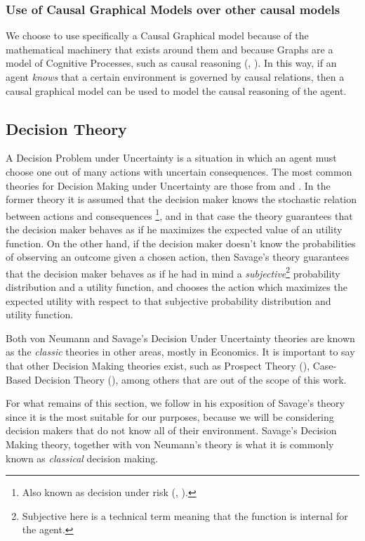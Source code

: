 \documentclass[english,letterpaper,12pt,final]{article}
\theoremstyle{definition}
\begin{document}
\subsubsection{Use of Causal Graphical Models over other causal models}
We choose to use specifically a Causal Graphical model because of the mathematical machinery that exists around them and because Graphs are a model of Cognitive Processes, such as causal reasoning (\cite{glymour2003learning}, \cite{danks2014unifying}). In this way, if an agent \textit{knows} that a certain environment is governed by causal relations, then a causal graphical model can be used to model the causal reasoning of the agent. 
	
	\subsection{Decision Theory}
	A Decision Problem under Uncertainty is a situation in which an agent must choose one out of many actions with uncertain consequences. The most common theories for Decision Making under Uncertainty are those from \cite{von1944theory} and \cite{savage1954the}. In the former theory it is assumed that the decision maker knows the stochastic relation between actions and consequences \footnote{Also known as decision under risk (\cite{binmore2008rational}, \cite{peterson2017introduction}).}, and in that case the theory guarantees that the decision maker behaves as if he maximizes the expected value of an utility function. On the other hand, if the decision maker doesn't know the probabilities of observing an outcome given a chosen action, then Savage's theory guarantees that the decision maker behaves as if he had in mind a \textit{subjective}\footnote{Subjective here is a technical term meaning that the function is internal for the agent.} probability distribution and a utility function, and chooses the action which maximizes the expected utility with respect to that subjective probability distribution and utility function. 
	
Both von Neumann and Savage's Decision Under Uncertainty theories are known as the \textit{classic} theories in other areas, mostly in Economics. It is important to say that other Decision Making theories exist, such as Prospect Theory (\cite{kahneman1979prospect}), Case-Based Decision Theory (\cite{gilboa1995case}), among others that are out of the scope of this work.

For what remains of this section, we follow \cite{bernardo2000bayesian} in his exposition of Savage's theory since it is the most suitable for our purposes, because we will be considering decision makers that do not know all of their environment. Savage's Decision Making theory, together with von Neumann's theory is what it is commonly known as \textit{classical} decision making. 
	
\end{document}
